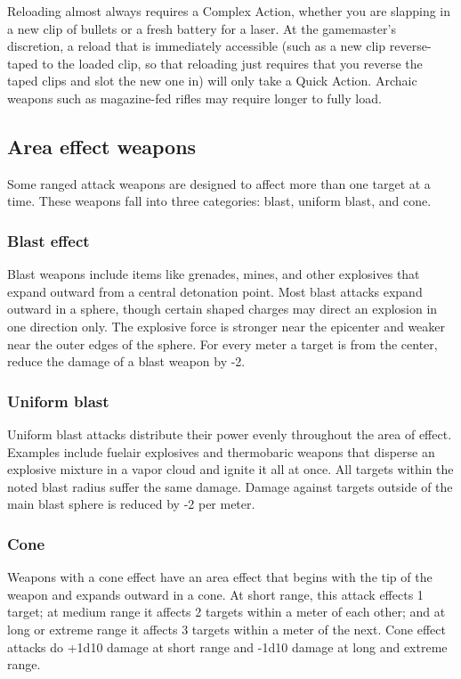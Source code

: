 Reloading almost always requires a Complex Action, whether you are slapping in a new clip of bullets or a fresh battery for a laser. At the gamemaster’s discretion, a reload that is immediately accessible (such as a new clip reverse-taped to the loaded clip, so that reloading just requires that you reverse the taped clips and slot the new one in) will only take a Quick Action. Archaic weapons such as magazine-fed rifles may require longer to fully load.


\subsection{Area effect weapons}
\label{sec:area-effect-weapons}

Some ranged attack weapons are designed to affect more than one target at a time. These weapons fall into three categories: blast, uniform blast, and cone.

\subsubsection{Blast effect}
Blast weapons include items like grenades, mines, and other explosives that expand outward from a central detonation point. Most blast attacks expand outward in a sphere, though certain shaped charges may direct an explosion in one direction only. The explosive force is stronger near the epicenter and weaker near the outer edges of the sphere. For every meter a target is from the center, reduce the damage of a blast weapon by -2.

\subsubsection{Uniform blast}
Uniform blast attacks distribute their power evenly throughout the area of effect. Examples include fuelair explosives and thermobaric weapons that disperse an explosive mixture in a vapor cloud and ignite it all at once. All targets within the noted blast radius suffer the same damage. Damage against targets outside of the main blast sphere is reduced by -2 per meter.

\subsubsection{Cone}
Weapons with a cone effect have an area effect that begins with the tip of the weapon and expands outward in a cone. At short range, this attack effects 1 target; at medium range it affects 2 targets within a meter of each other; and at long or extreme range it affects 3 targets within a meter of the next. Cone effect attacks do +1d10 damage at short range and -1d10 damage at long and extreme range.


